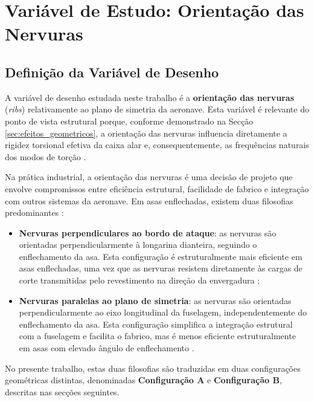 \documentclass[a4paper,fleqn,noprintline]{cas-dc}
\begin{document}
\section{Variável de Estudo: Orientação das Nervuras}
\label{chap:variavel}

\subsection{Definição da Variável de Desenho}

A variável de desenho estudada neste trabalho é a \textbf{orientação das nervuras} (\textit{ribs}) relativamente ao plano de simetria da aeronave. Esta variável é relevante do ponto de vista estrutural porque, conforme demonstrado na Secção \ref{sec:efeitos_geometricos}, a orientação das nervuras influencia diretamente a rigidez torsional efetiva da caixa alar e, consequentemente, as frequências naturais dos modos de torção \cite{Niu1988, Megson2012}.

Na prática industrial, a orientação das nervuras é uma decisão de projeto que envolve compromissos entre eficiência estrutural, facilidade de fabrico e integração com outros sistemas da aeronave. Em asas enflechadas, existem duas filosofias predominantes \cite{Raymer2018, Niu1988}:

\begin{itemize}
    \item \textbf{Nervuras perpendiculares ao bordo de ataque}: as nervuras são orientadas perpendicularmente à longarina dianteira, seguindo o enflechamento da asa. Esta configuração é estruturalmente mais eficiente em asas enflechadas, uma vez que as nervuras resistem diretamente às cargas de corte transmitidas pelo revestimento na direção da envergadura \cite{Megson2012};

    \item \textbf{Nervuras paralelas ao plano de simetria}: as nervuras são orientadas perpendicularmente ao eixo longitudinal da fuselagem, independentemente do enflechamento da asa. Esta configuração simplifica a integração estrutural com a fuselagem e facilita o fabrico, mas é menos eficiente estruturalmente em asas com elevado ângulo de enflechamento \cite{Niu1988}.
\end{itemize}

No presente trabalho, estas duas filosofias são traduzidas em duas configurações geométricas distintas, denominadas \textbf{Configuração A} e \textbf{Configuração B}, descritas nas secções seguintes.
\end{document}
